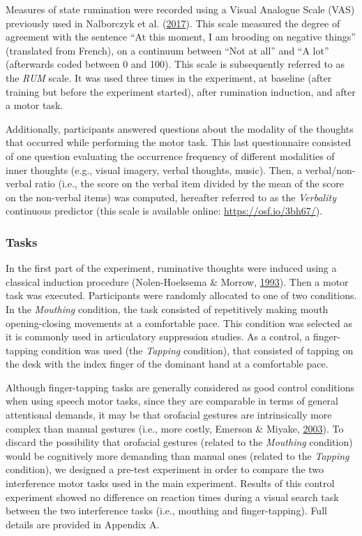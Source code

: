 \documentclass[a4paper,12pt,twoside,onecolumn,openright,final,oldfontcommands]{memoir}
\begin{document}
Measures of state rumination were recorded using a Visual Analogue Scale (VAS) previously used in Nalborczyk et al. (\protect\hyperlink{ref-nalborczyk_orofacial_2017}{2017}). This scale measured the degree of agreement with the sentence \enquote{At this moment, I am brooding on negative things} (translated from French), on a continuum between \enquote{Not at all} and \enquote{A lot} (afterwards coded between 0 and 100). This scale is subsequently referred to as the \emph{RUM} scale. It was used three times in the experiment, at baseline (after training but before the experiment started), after rumination induction, and after a motor task.

Additionally, participants answered questions about the modality of the thoughts that occurred while performing the motor task. This last questionnaire consisted of one question evaluating the occurrence frequency of different modalities of inner thoughts (e.g., visual imagery, verbal thoughts, music). Then, a verbal/non-verbal ratio (i.e., the score on the verbal item divided by the mean of the score on the non-verbal items) was computed, hereafter referred to as the \emph{Verbality} continuous predictor (this scale is available online: \url{https://osf.io/3bh67/}).

\hypertarget{tasks}{%
\subsubsection{Tasks}\label{tasks}}

In the first part of the experiment, ruminative thoughts were induced using a classical induction procedure (Nolen-Hoeksema \& Morrow, \protect\hyperlink{ref-nolen-hoeksema_effects_1993}{1993}). Then a motor task was executed. Participants were randomly allocated to one of two conditions. In the \emph{Mouthing} condition, the task consisted of repetitively making mouth opening-closing movements at a comfortable pace. This condition was selected as it is commonly used in articulatory suppression studies. As a control, a finger-tapping condition was used (the \emph{Tapping} condition), that consisted of tapping on the desk with the index finger of the dominant hand at a comfortable pace.

Although finger-tapping tasks are generally considered as good control conditions when using speech motor tasks, since they are comparable in terms of general attentional demands, it may be that orofacial gestures are intrinsically more complex than manual gestures (i.e., more costly, Emerson \& Miyake, \protect\hyperlink{ref-emerson_role_2003}{2003}). To discard the possibility that orofacial gestures (related to the \emph{Mouthing} condition) would be cognitively more demanding than manual ones (related to the \emph{Tapping} condition), we designed a pre-test experiment in order to compare the two interference motor tasks used in the main experiment. Results of this control experiment showed no difference on reaction times during a visual search task between the two interference tasks (i.e., mouthing and finger-tapping). Full details are provided in Appendix A.
\end{document}
